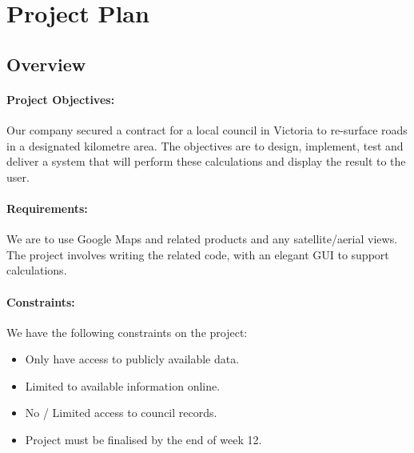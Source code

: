 \documentclass[a4paper,11pt]{article}
\begin{document}
\section{Project Plan}



\subsection{Overview}

\paragraph{Project Objectives:}

Our company secured a contract for a local council in Victoria to re-surface
roads in a designated kilometre area. The objectives are to design, implement,
test and deliver a system that will perform these calculations and display the
result to the user.

\paragraph{Requirements:}

We are to use Google Maps and related products and any satellite/aerial views.
The project involves writing the related code, with an elegant GUI to support
calculations. \autocite[2]{intro:1}

\paragraph{Constraints:}

We have the following constraints on the project:

\begin{itemize}
  \item Only have access to publicly available data.
  \item Limited to available information online.
  \item No / Limited access to council records.
  \item Project must be finalised by the end of week 12.
\end{itemize}
\end{document}
